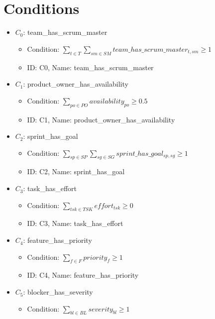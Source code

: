\documentclass{article}
\begin{document}
\section{Conditions}
\begin{itemize}
    \item $C_0$: team\_has\_scrum\_master
        \begin{itemize}
            \item Condition: $\sum_{t \in T} \sum_{sm \in SM} team\_has\_scrum\_master_{t,sm} \geq 1$
            \item ID: C0, Name: team\_has\_scrum\_master
        \end{itemize}
    \item $C_1$: product\_owner\_has\_availability
        \begin{itemize}
            \item Condition: $\sum_{po \in PO} availability_{po} \geq 0.5$
            \item ID: C1, Name: product\_owner\_has\_availability
        \end{itemize}
    \item $C_2$: sprint\_has\_goal
        \begin{itemize}
            \item Condition: $\sum_{sp \in SP} \sum_{sg \in SG} sprint\_has\_goal_{sp,sg} \geq 1$
            \item ID: C2, Name: sprint\_has\_goal
        \end{itemize}
    \item $C_3$: task\_has\_effort
        \begin{itemize}
            \item Condition: $\sum_{tsk \in TSK} effort_{tsk} \geq 0$
            \item ID: C3, Name: task\_has\_effort
        \end{itemize}
    \item $C_4$: feature\_has\_priority
        \begin{itemize}
            \item Condition: $\sum_{f \in F} priority_f \geq 1$
            \item ID: C4, Name: feature\_has\_priority
        \end{itemize}
    \item $C_5$: blocker\_has\_severity
        \begin{itemize}
            \item Condition: $\sum_{bl \in BL} severity_{bl} \geq 1$

\end{itemize}
\end{itemize}
\end{document}
